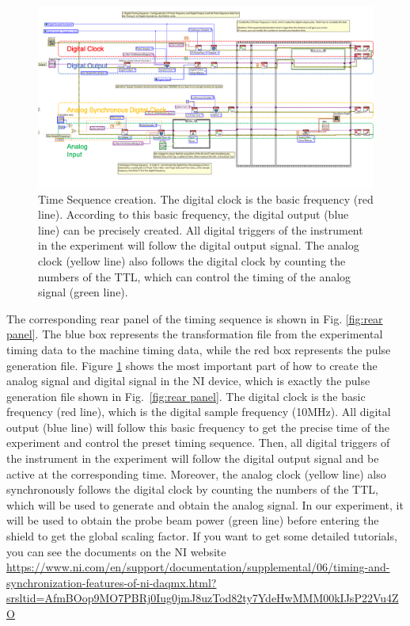 \documentclass{article}
\begin{document}
\begin{figure}[htbp]
    \centering
    \includegraphics[width=1\linewidth]{fig/TimeSequence_creation.png}
    \caption{Time Sequence creation. The digital clock is the basic frequency (red line). According to this basic frequency, the digital output (blue line) can be precisely created. All digital triggers of the instrument in the experiment will follow the digital output signal. The analog clock (yellow line) also follows the digital clock by counting the numbers of the TTL, which can control the timing of the analog signal (green line).}
    \label{fig:time sequence}
\end{figure}
The corresponding rear panel of the timing sequence is shown in Fig. \ref{fig:rear panel}. The blue box represents the transformation file from the experimental timing data to the machine timing data, while the red box represents the pulse generation file. Figure \ref{fig:time sequence} shows the most important part of how to create the analog signal and digital signal in the NI device, which is exactly the pulse generation file shown in Fig.~\ref{fig:rear panel}. The digital clock is the basic frequency (red line), which is the digital sample frequency (10MHz). All digital output (blue line) will follow this basic frequency to get the precise time of the experiment and control the preset timing sequence. Then, all digital triggers of the instrument in the experiment will follow the digital output signal and be active at the corresponding time. Moreover, the analog clock (yellow line) also synchronously follows the digital clock by counting the numbers of the TTL, which will be used to generate and obtain the analog signal. In our experiment, it will be used to obtain the probe beam power (green line) before entering the shield to get the global scaling factor. If you want to get some detailed tutorials, you can see the documents on the NI website \url{https://www.ni.com/en/support/documentation/supplemental/06/timing-and-synchronization-features-of-ni-daqmx.html?srsltid=AfmBOop9MO7PBRj0Iug0jmJ8uzTod82ty7YdeHwMMM00kIJsP22Vu4ZO}
\end{document}
